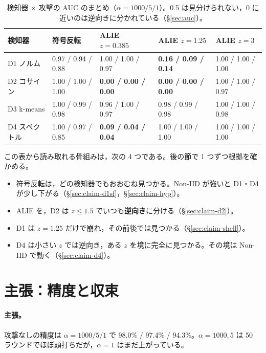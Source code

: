 \documentclass[a4j, dvipdfmx]{jsarticle}  %
\begin{document}
\begin{table}[H]
\centering
\caption{検知器 $\times$ 攻撃の AUC のまとめ（$\alpha = 1000 / 5 / 1$）。0.5 は見分けられない，0 に近いのは逆向きに分かれている（\S\ref{sec:auc}）。}
\label{tab:overview}
\small
\begin{tabular}{@{}P{2.0cm} P{3.0cm} P{3.0cm} P{3.4cm} P{3.4cm}@{}}
\toprule
検知器 & 符号反転 & ALIE $z = 0.385$ & ALIE $z = 1.25$ & ALIE $z = 3$ \\
\midrule
D1 ノルム & 0.97 / 0.94 / 0.88 & 1.00 / 1.00 / 0.97 & \textbf{0.16 / 0.09 / 0.14} & 1.00 / 1.00 / 1.00 \\
D2 コサイン & 1.00 / 1.00 / 1.00 & \textbf{0.00 / 0.00 / 0.00} & \textbf{0.00 / 0.00 / 0.00} & 1.00 / 1.00 / 0.97 \\
D3 k-means & 1.00 / 0.99 / 0.98 & 0.96 / 1.00 / 0.97 & 0.98 / 0.99 / 0.98 & 1.00 / 1.00 / 0.98 \\
D4 スペクトル & 1.00 / 0.97 / 0.85 & \textbf{0.09 / 0.04 / 0.04} & 1.00 / 1.00 / 1.00 & 1.00 / 1.00 / 1.00 \\
\bottomrule
\end{tabular}
\end{table}

この表から読み取れる骨組みは，次の 4 つである。後の節で 1 つずつ根拠を確かめる。
\begin{itemize}
  \item 符号反転は，どの検知器でもおおむね見つかる。Non-IID が強いと D1・D4 が少し下がる（\S\ref{sec:claim-d1sf}，\S\ref{sec:claim-hyp}）。
  \item ALIE を，D2 は $z \le 1.5$ でいつも\textbf{逆向き}に分ける（\S\ref{sec:claim-d2}）。
  \item D1 は $z = 1.25$ だけで崩れ，その前後では見つかる（\S\ref{sec:claim-shell}）。
  \item D4 は小さい $z$ では逆向き，ある $z$ を境に完全に見つかる。その境は Non-IID で動く（\S\ref{sec:claim-d4}）。
\end{itemize}

\section{主張：精度と収束}
\label{sec:claim-acc}

\paragraph{主張。}
攻撃なしの精度は $\alpha = 1000 / 5 / 1$ で 98.0\% / 97.4\% / 94.3\%。$\alpha = 1000, 5$ は 50 ラウンドでほぼ頭打ちだが，$\alpha = 1$ はまだ上がっている。
\end{document}
